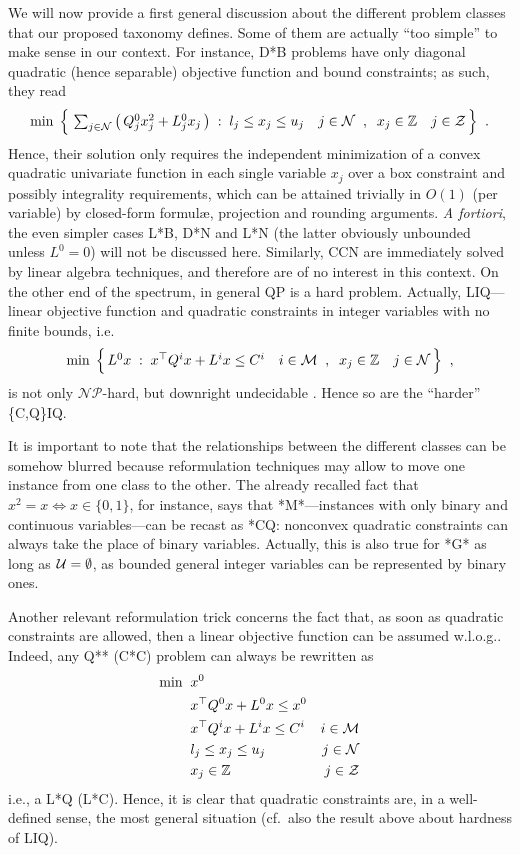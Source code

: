 We will now provide a first general discussion about the different problem classes that our proposed taxonomy defines. Some of them are actually ``too simple'' to make sense in our context. For instance, D*B problems have only diagonal quadratic (hence separable) objective function and bound constraints; as such, they read
\[
 \textstyle
 \min \; \Big\{ \,
 \sum_{j \in \mathcal{N}} \big( \, Q^0_j x_j^2 + L^0_j x_j \, \big) \;:\;
 l_j \leq x_j \leq u_j \quad j \in \mathcal{N} \;\;,\;\;
 x_j \in \mathbb{Z} \quad j \in \mathcal{Z} \, \Big\}
 \;\; .
\]
Hence, their solution only requires the independent minimization of a convex quadratic univariate function in each single variable $x_j$ over a box constraint and possibly integrality requirements, which can be attained trivially in $O(1)$ (per variable) by closed-form formul{\ae}, projection and rounding arguments. \emph{A fortiori}, the even simpler cases L*B, D*N and L*N (the latter obviously unbounded unless $L^0 = 0$) will not be discussed here. Similarly, CCN are immediately solved by linear algebra techniques, and therefore are of no interest in this context. On the other end of the spectrum, in general QP is a hard problem. Actually, LIQ---linear objective function and quadratic constraints in integer variables with no finite bounds, i.e. 
\[
 \textstyle
 \min \; \Big\{ \, L^0 x \;:\;
 x^\top Q^i x + L^i x \leq C^i \quad i \in \mathcal{M} \;\;,\;\;
 x_j \in \mathbb{Z} \quad j \in \mathcal{N} \, \Big\}
 \;\; ,
\]
is not only $\mathcal{NP}$-hard, but downright undecidable \cite{jeroslow}. Hence so are the ``harder'' \{C,Q\}IQ.

\smallskip
It is important to note that the relationships between the different classes can be somehow blurred because reformulation techniques may allow to move one instance from one class to the other. The already recalled fact that $x^2 = x \iff x \in \{0, 1\}$, for instance, says that *M*---instances with only binary and continuous variables---can be recast as *CQ: nonconvex quadratic constraints can always take the place of binary variables. Actually, this is also true for *G* as long as $\mathcal{U} = \emptyset$, as bounded general integer variables can be represented by binary ones.

Another relevant reformulation trick concerns the fact that, as soon as quadratic constraints are allowed, then a linear objective function can be assumed w.l.o.g.. Indeed, any Q** (C*C) problem can always be rewritten as
%
\begin{align*}	
 \min \;\;
 & x^0 \\
 & x^\top Q^0 x + L^0 x \leq x^0 & \\ 
 & x^\top Q^i x + L^i x \leq C^i & i \in \mathcal{M} \\ 
 & l_j \leq x_j \leq u_j & j \in \mathcal{N}  \\
 & x_j \in \mathbb{Z} & j \in \mathcal{Z}
\end{align*}
%
i.e., a L*Q (L*C). Hence, it is clear that quadratic constraints are, in a well-defined sense, the most general situation (cf.~also the result above about hardness of LIQ).

